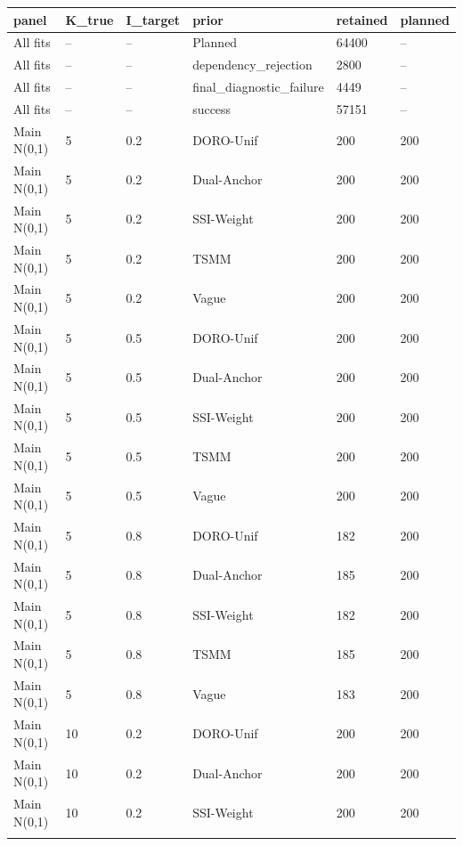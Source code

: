 \begin{longtable}{llllll}
\toprule
panel & K\_true & I\_target & prior & retained & planned \\
\midrule\endhead
All fits & -- & -- & Planned & 64400 & -- \\ \addlinespace[3pt]
All fits & -- & -- & dependency\_rejection & 2800 & -- \\ \addlinespace[3pt]
All fits & -- & -- & final\_diagnostic\_failure & 4449 & -- \\ \addlinespace[3pt]
All fits & -- & -- & success & 57151 & -- \\ \addlinespace[3pt]
Main N(0,1) & 5 & 0.2 & DORO-Unif & 200 & 200 \\ \addlinespace[3pt]
Main N(0,1) & 5 & 0.2 & Dual-Anchor & 200 & 200 \\ \addlinespace[3pt]
Main N(0,1) & 5 & 0.2 & SSI-Weight & 200 & 200 \\ \addlinespace[3pt]
Main N(0,1) & 5 & 0.2 & TSMM & 200 & 200 \\ \addlinespace[3pt]
Main N(0,1) & 5 & 0.2 & Vague & 200 & 200 \\ \addlinespace[3pt]
Main N(0,1) & 5 & 0.5 & DORO-Unif & 200 & 200 \\ \addlinespace[3pt]
Main N(0,1) & 5 & 0.5 & Dual-Anchor & 200 & 200 \\ \addlinespace[3pt]
Main N(0,1) & 5 & 0.5 & SSI-Weight & 200 & 200 \\ \addlinespace[3pt]
Main N(0,1) & 5 & 0.5 & TSMM & 200 & 200 \\ \addlinespace[3pt]
Main N(0,1) & 5 & 0.5 & Vague & 200 & 200 \\ \addlinespace[3pt]
Main N(0,1) & 5 & 0.8 & DORO-Unif & 182 & 200 \\ \addlinespace[3pt]
Main N(0,1) & 5 & 0.8 & Dual-Anchor & 185 & 200 \\ \addlinespace[3pt]
Main N(0,1) & 5 & 0.8 & SSI-Weight & 182 & 200 \\ \addlinespace[3pt]
Main N(0,1) & 5 & 0.8 & TSMM & 185 & 200 \\ \addlinespace[3pt]
Main N(0,1) & 5 & 0.8 & Vague & 183 & 200 \\ \addlinespace[3pt]
Main N(0,1) & 10 & 0.2 & DORO-Unif & 200 & 200 \\ \addlinespace[3pt]
Main N(0,1) & 10 & 0.2 & Dual-Anchor & 200 & 200 \\ \addlinespace[3pt]
Main N(0,1) & 10 & 0.2 & SSI-Weight & 200 & 200 \\ \addlinespace[3pt]

\end{longtable}
